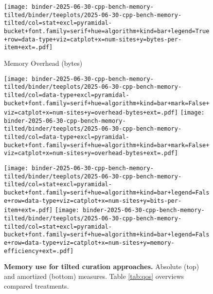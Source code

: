 \begin{figure}


\centering
\texttt{[image: binder-2025-06-30-cpp-bench-memory-tilted/binder/teeplots/2025-06-30-cpp-bench-memory-tilted/col=stat+excl=pyramidal-bucket+font.family=serif+hue=algorithm+kind=bar+legend=True+row=data-type+viz=catplot+x=num-sites+y=bytes-per-item+ext=.pdf]}

\vspace{1ex}

{\small Memory Overhead (bytes)\phantom{422}}

\vspace{1ex}

\hspace{-1ex}%
\texttt{[image: binder-2025-06-30-cpp-bench-memory-tilted/binder/teeplots/2025-06-30-cpp-bench-memory-tilted/col=data-type+excl=pyramidal-bucket+font.family=serif+hue=algorithm+kind=bar+mark=False+viz=catplot+x=num-sites+y=overhead-bytes+ext=.pdf]}%
\hspace{-0.5ex}%
\texttt{[image: binder-2025-06-30-cpp-bench-memory-tilted/binder/teeplots/2025-06-30-cpp-bench-memory-tilted/col=data-type+excl=pyramidal-bucket+font.family=serif+hue=algorithm+kind=bar+mark=False+viz=catplot+x=num-sites+y=overhead-bytes+ext=.pdf]}

\vspace{1.1ex}

\texttt{[image: binder-2025-06-30-cpp-bench-memory-tilted/binder/teeplots/2025-06-30-cpp-bench-memory-tilted/col=stat+excl=pyramidal-bucket+font.family=serif+hue=algorithm+kind=bar+legend=False+row=data-type+viz=catplot+x=num-sites+y=bits-per-item+ext=.pdf]}%
\texttt{[image: binder-2025-06-30-cpp-bench-memory-tilted/binder/teeplots/2025-06-30-cpp-bench-memory-tilted/col=stat+excl=pyramidal-bucket+font.family=serif+hue=algorithm+kind=bar+legend=False+row=data-type+viz=catplot+x=num-sites+y=memory-efficiency+ext=.pdf]}

\vspace{-2ex}

\caption{%
\textbf{Memory use for tilted curation approaches.}
\small
Absolute (top) and amortized (bottom) measures.
Table \ref{tab:qos} overviews compared treatments.
}
\label{fig:memory}
\end{figure}
